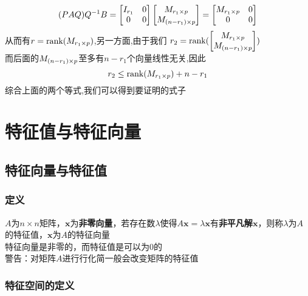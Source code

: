 \documentclass{article}
\newenvironment{cproof}{%
\heiti{证明}\kaishu
}{%
}
\newcommand{\ve}{\boldsymbol}
\begin{document}
\begin{CJK}{UTF8}{gkai}
\begin{cproof}
\[ (P A Q)Q^{-1} B = \begin{bmatrix}
    I_{r_1}& 0\\
    0&0\\
\end{bmatrix}\begin{bmatrix}
    M_{r_1\times p} \\
    M_{(n - r_1)\times p}  \\
   \end{bmatrix} = \begin{bmatrix}
    M_{r_1\times p}&0\\
    0&0\\
\end{bmatrix}
\]
从而有$r = \text{rank} (M_{r_1\times p})$,另一方面,由于我们
$r_2 = \text{rank} (\begin{bmatrix}
    M_{r_1\times p} \\
    M_{(n - r_1)\times p}  \\
   \end{bmatrix})$\\
而后面的$M_{(n - r_1)\times p}$至多有$n-r_1$个向量线性无关,因此
\[r_2 \leq \text{rank} (M_{r_1\times p}) + n - r_1\]
综合上面的两个等式,我们可以得到要证明的式子\\
\end{cproof}
\newpage
\section{特征值与特征向量}
\subsection{特征向量与特征值}

\subsubsection{定义}
$A$为$n\times n$矩阵，$\ve{x}$为\textbf{非零向量}，若存在数$\lambda$使得$A\ve{x} = \lambda \ve{x}$有\textbf{非平凡解}$\ve{x}$，则称$\lambda$为$A$的特征值，$\ve{x}$为$A$的特征向量\\ 

特征向量是非零的，而特征值是可以为0的\\

警告：对矩阵$A$进行行化简一般会改变矩阵的特征值\\

\subsubsection{特征空间的定义}


\end{CJK}
\end{document}
